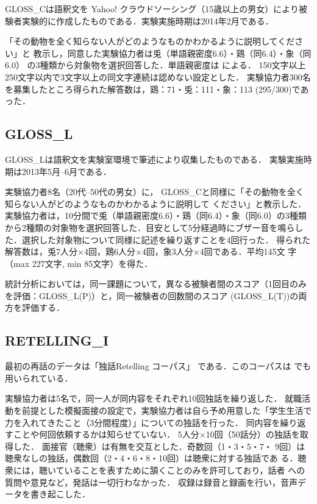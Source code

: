 \documentclass[japanese]{jnlp_1.4}
\newcommand{\modified}[1]{}
\begin{document}
GLOSS\_Cは語釈文を Yahoo! クラウドソーシング（15歳以上の男女）により被験者実験的に作成したものである．実験実施時期は2014年2月である．

「その動物を全く知らない人がどのようなものかわかるように説明してください」と
教示し，同意した実験協力者は兎（単語親密度6.6）・鶏（同6.4）・象（同6.0）
の3種類から対象物を選択回答した．単語親密度は
\cite{amano-1999-ntt-database}による．
150文字以上250文字以内で3文字以上の同文字連続は認めない設定とした．
実験協力者300名を募集したところ得られた解答数は，鶏：71・兎：111・象：113 (295/300)であった．

\modified{尚，このデータの質的分析は \cite{kato-cjws-2015} を参照されたい．}


\subsection{GLOSS\_L}

GLOSS\_Lは語釈文を実験室環境で筆述により収集したものである．
実験実施時期は2013年5月--6月である．

実験協力者8名（20代--50代の男女）に，
GLOSS\_Cと同様に「その動物を全く知らない人がどのようなものかわかるように説明して
ください」と教示した．実験協力者は，10分間で兎（単語親密度6.6）・鶏（同6.4）・象（同6.0）の3種類から2種類の対象物を選択回答した．目安として5分経過時にブザー音を鳴らした．選択した対象物について同様に記述を繰り返すことを4回行った．
得られた解答数は，兎7人分×4回，鶏6人分×4回，象3人分×4回である．平均145文
字（max 227文字, min 85文字）を得た．

統計分析においては，同一課題について，異なる被験者間のスコア（1回目のみ
を評価：GLOSS\_L(P)）と，同一被験者の回数間のスコア
(GLOSS\_L(T))の両方を評価する．

\modified{尚，このデータを用いた認知的な分析は \cite{kato-ninjal-2015,kato-jcss-2015} を参照されたい．}


\subsection{RETELLING\_I}

最初の再話のデータは「独話Retelling コーパス」
\cite{yasuda-2013-JASS31,yasuda-2013-JASS32}である．このコーパスは
\cite{miyabe-2014-GNWS}でも用いられている．

実験協力者は5名で，同一人が同内容をそれぞれ10回独話を繰り返した．
就職活動を前提とした模擬面接の設定で，実験協力者は自ら予め用意した「学生生活で力を入れてきたこと（3分間程度）」についての独話を行った．
同内容を繰り返すことや何回依頼するかは知らせていない．
5人分×10回（50話分）の独話を取得した．
面接官（聴衆）は有無を交互とした．奇数回（1・3・5・7・
9回）は聴衆なしの独話，偶数回（2・4・6・8・10回）は聴衆に対する独話であ
る．聴衆には，聴いていることを表すために頷くことのみを許可しており，話者
への質問や意見など，発話は一切行わなかった．
収録は録音と録画を行い，音声データを書き起こした．
\end{document}
